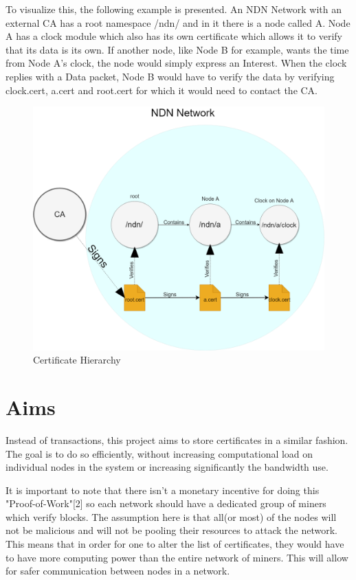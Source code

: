 To visualize this, the following example is presented. An NDN Network with an external CA has a root namespace /ndn/ and in it there is a node called A. Node A has a clock module which also has its own certificate which allows it to verify that its data is its own. If another node, like Node B for example, wants the time from Node A's clock, the node would simply express an Interest. When the clock replies with a Data packet, Node B would have to verify the data by verifying clock.cert, a.cert and root.cert for which it would need to contact the CA. 
\begin{figure}[h]
\centering
\includegraphics[width=6in,left]{certarch.png}
\caption{Certificate Hierarchy}
\end{figure}
\section{Aims}
Instead of transactions, this project aims to store certificates in a similar fashion. The goal is to do so efficiently, without increasing computational load on individual nodes in the system or increasing significantly the bandwidth use.

 It is important to note that there isn't a monetary incentive for doing this "Proof-of-Work"[2] so each network should have a dedicated group of miners which verify blocks. The assumption here is that all(or most) of the nodes will not be malicious and will not be pooling their resources to attack the network. This means that in order for one to alter the list of certificates, they would have to have more computing power than the entire network of miners. This will allow for safer communication between nodes in a network. 
\vfill
